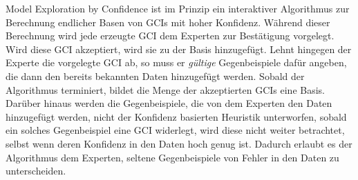 \documentclass[ngerman,fleqn,DIV=12]{scrartcl}
\begin{document}
Model Exploration by Confidence ist im Prinzip ein interaktiver Algorithmus zur Berechnung
endlicher Basen von GCIs mit hoher Konfidenz.  Während dieser Berechnung wird jede
erzeugte GCI dem Experten zur Bestätigung vorgelegt.  Wird diese GCI akzeptiert, wird sie
zu der Basis hinzugefügt.  Lehnt hingegen der Experte die vorgelegte GCI ab, so muss er
\emph{gültige} Gegenbeispiele dafür angeben, die dann den bereits bekannten Daten
hinzugefügt werden.  Sobald der Algorithmus terminiert, bildet die Menge der akzeptierten
GCIs eine Basis.  Darüber hinaus werden die Gegenbeispiele, die von dem Experten den Daten
hinzugefügt werden, nicht der Konfidenz basierten Heuristik unterworfen, \dh sobald ein
solches Gegenbeispiel eine GCI widerlegt, wird diese nicht weiter betrachtet, selbst wenn
deren Konfidenz in den Daten hoch genug ist.  Dadurch erlaubt es der Algorithmus dem
Experten, seltene Gegenbeispiele von Fehler in den Daten zu unterscheiden.

\printbibliography{}
\end{document}
